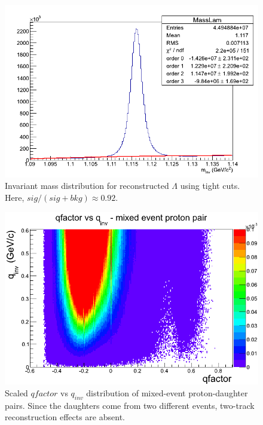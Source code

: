 {\begin{figure}[hbtp]
\includegraphics[scale=0.5]{11h_V0_MassLam_TightCuts.png}
\caption[Invariant mass distribution for reconstructed $\Lambda$ using tight cuts]{Invariant mass distribution for reconstructed $\Lambda$ using tight cuts.  Here, $sig/(sig+bkg) \approx 0.92$.}
\label{fig:MassTightCut}
\end{figure}

\begin{figure}[hbtp]
\includegraphics[scale=0.5]{Qfac_MixedEvent.png}
\caption[$qfactor$ vs $q_{inv}$ distribution of mixed-event pairs]{Scaled $qfactor$ vs $q_{inv}$ distribution of mixed-event proton-daughter pairs.  Since the daughters come from two different events, two-track reconstruction effects are absent.}
\label{fig:QfacMixed}
\end{figure}

}
